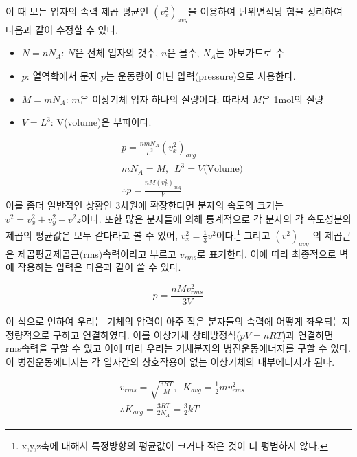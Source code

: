 \begin{flushleft}
이 때 모든 입자의 속력 제곱 평균인 $(v^2_x)_{avg}$을 이용하여 단위면적당 힘을 정리하여 다음과 같이 수정할 수 있다.


 \begin{itemize}
    \item  $N= nN_A$: $N$은 전체 입자의 갯수, $n$은 몰수, $N_A$는 아보가드로 수
    \item  $p$: 열역학에서 문자 $p$는 운동량이 아닌 압력(pressure)으로 사용한다.
    \item  $M=mN_A$: $m$은 이상기체 입자 하나의 질량이다. 따라서 $M$은 1mol의 질량
    \item  $V=L^3$: V(volume)은 부피이다.
  \end{itemize} 

\begin{align}
 &p=\frac{nmN_A}{L^3}(v^2_x)_{avg}\\
 & mN_A =M, \phantom{o} L^3 =V \textrm{(Volume)}\\
 & \therefore p=\frac{nM(v^2_x)_{avg}}{V}
\end{align}
이를 좀더 일반적인 상황인 3차원에 확장한다면 분자의 속도의 크기는 $v^2=v^2_{x}+v^2_{y}+v^2{z}$이다. 또한 많은 분자들에 의해
통계적으로 각 분자의 각 속도성분의 제곱의 평균값은 모두 같다라고 볼 수 있어, $v^2_x=\frac{1}{3}v^2$이다.\footnote{x,y,z축에 대해서
특정방향의 평균값이 크거나 작은 것이 더 평범하지 않다.} 그리고 $(v^2)_{avg}$
의 제곱근은 제곱평균제곱근(rms)속력이라고 부르고 $v_{rms}$로 표기한다. 이에 따라 최종적으로 벽에 작용하는 압력은 다음과 
같이 쓸 수 있다. 

\begin{equation}
  p=\frac{nMv^2_{rms}}{3V}
\end{equation}

이 식으로 인하여 우리는 기체의 압력이 아주 작은 분자들의 속력에 어떻게 좌우되는지 정량적으로 구하고 연결하였다. 
이를 이상기체 상태방정식($pV=nRT$)과 연결하면 rms속력을 구할 수 있고 이에 따라 우리는 기체분자의 
병진운동에너지를 구할 수 있다. 이 병진운동에너지는 각 입자간의 상호작용이 없는 이상기체의 내부에너지가 된다.

  \begin{defn}

    \begin{align}\label{eq:ideal gas's energy}
    &v_{rms}=\sqrt{\frac{3RT}{M}}, \phantom{o} K_{avg}=\frac{1}{2}mv^2_{rms}\\
    &\therefore K_{avg}=\frac{3RT}{2N_A}=\frac{3}{2}kT
    \end{align}


\end{defn}
\end{flushleft}
